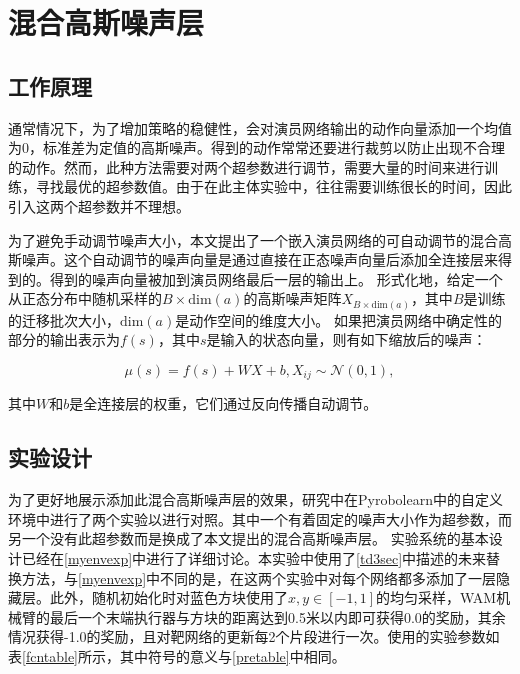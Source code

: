 \chapter{混合高斯噪声层}

\section{工作原理}
通常情况下，为了增加策略的稳健性，会对演员网络输出的动作向量添加一个均值为0，标准差为定值的高斯噪声。得到的动作常常还要进行裁剪以防止出现不合理的动作。然而，此种方法需要对两个超参数进行调节，需要大量的时间来进行训练，寻找最优的超参数值。由于在此主体实验中，往往需要训练很长的时间，因此引入这两个超参数并不理想。
    
为了避免手动调节噪声大小，本文提出了一个嵌入演员网络的可自动调节的混合高斯噪声。这个自动调节的噪声向量是通过直接在正态噪声向量后添加全连接层来得到的。得到的噪声向量被加到演员网络最后一层的输出上。
形式化地，给定一个从正态分布中随机采样的$B\times \mathrm{dim}(a)$的高斯噪声矩阵$X_{B\times \mathrm{dim}(a)}$，其中$B$是训练的迁移批次大小，$\mathrm{dim}(a)$是动作空间的维度大小。
如果把演员网络中确定性的部分的输出表示为$f(s)$，其中$s$是输入的状态向量，则有如下缩放后的噪声：

    $$ \mu(s) = f(s) + W X + b, X_{ij}\sim\mathcal N(0,1),$$

    其中$W$和$b$是全连接层的权重，它们通过反向传播自动调节。

\section{实验设计}
    为了更好地展示添加此混合高斯噪声层的效果，研究中在Pyrobolearn中的自定义环境中进行了两个实验以进行对照。其中一个有着固定的噪声大小作为超参数，而另一个没有此超参数而是换成了本文提出的混合高斯噪声层。
    实验系统的基本设计已经在\ref{myenvexp}中进行了详细讨论。本实验中使用了\ref{td3sec}中描述的未来替换方法，与\ref{myenvexp}中不同的是，在这两个实验中对每个网络都多添加了一层隐藏层。此外，随机初始化时对蓝色方块使用了$x,y\in[-1,1]$的均匀采样，WAM机械臂的最后一个末端执行器与方块的距离达到0.5米以内即可获得0.0的奖励，其余情况获得-1.0的奖励，且对靶网络的更新每2个片段进行一次。使用的实验参数如表\ref{fcntable}所示，其中符号的意义与\ref{pretable}中相同。

